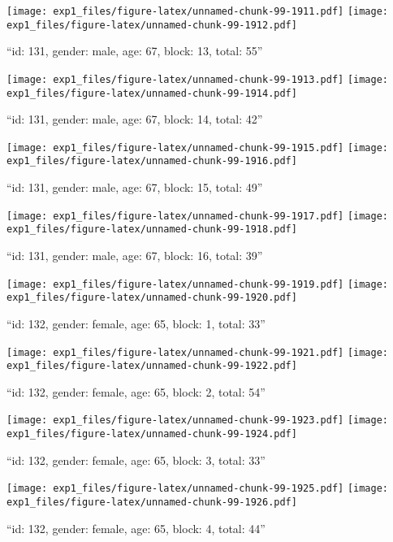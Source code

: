 \documentclass[,]{article}
\begin{document}
\texttt{[image: exp1\_files/figure-latex/unnamed-chunk-99-1911.pdf]}
\texttt{[image: exp1\_files/figure-latex/unnamed-chunk-99-1912.pdf]}

\newpage
[1] 

``id: 131, gender: male, age: 67, block: 13, total: 55''

\texttt{[image: exp1\_files/figure-latex/unnamed-chunk-99-1913.pdf]}
\texttt{[image: exp1\_files/figure-latex/unnamed-chunk-99-1914.pdf]}

\newpage
[1] 

``id: 131, gender: male, age: 67, block: 14, total: 42''

\texttt{[image: exp1\_files/figure-latex/unnamed-chunk-99-1915.pdf]}
\texttt{[image: exp1\_files/figure-latex/unnamed-chunk-99-1916.pdf]}

\newpage
[1] 

``id: 131, gender: male, age: 67, block: 15, total: 49''

\texttt{[image: exp1\_files/figure-latex/unnamed-chunk-99-1917.pdf]}
\texttt{[image: exp1\_files/figure-latex/unnamed-chunk-99-1918.pdf]}

\newpage
[1] 

``id: 131, gender: male, age: 67, block: 16, total: 39''

\texttt{[image: exp1\_files/figure-latex/unnamed-chunk-99-1919.pdf]}
\texttt{[image: exp1\_files/figure-latex/unnamed-chunk-99-1920.pdf]}

\newpage
[1] 

``id: 132, gender: female, age: 65, block: 1, total: 33''

\texttt{[image: exp1\_files/figure-latex/unnamed-chunk-99-1921.pdf]}
\texttt{[image: exp1\_files/figure-latex/unnamed-chunk-99-1922.pdf]}

\newpage
[1] 

``id: 132, gender: female, age: 65, block: 2, total: 54''

\texttt{[image: exp1\_files/figure-latex/unnamed-chunk-99-1923.pdf]}
\texttt{[image: exp1\_files/figure-latex/unnamed-chunk-99-1924.pdf]}

\newpage
[1] 

``id: 132, gender: female, age: 65, block: 3, total: 33''

\texttt{[image: exp1\_files/figure-latex/unnamed-chunk-99-1925.pdf]}
\texttt{[image: exp1\_files/figure-latex/unnamed-chunk-99-1926.pdf]}

\newpage
[1] 

``id: 132, gender: female, age: 65, block: 4, total: 44''
\end{document}
